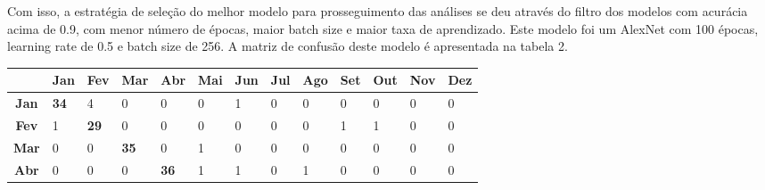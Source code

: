 \documentclass[
	12pt,				%
	openright,			%
	twoside,			%
	a4paper,			%
	english,			%
	brazil,				%
	svgnames
	]{abntex2}\usepackage[]{graphicx}\usepackage[]{color}
\begin{document}
Com isso, a estratégia de seleção do melhor modelo para prosseguimento das análises se deu através do filtro dos modelos com acurácia acima de 0.9, com menor número de épocas, maior batch size e maior taxa de aprendizado. Este modelo foi um AlexNet com 100 épocas, learning rate de 0.5 e batch size de 256. A matriz de confusão deste modelo é apresentada na tabela 2.

\begin{table}[h]
\centering
\begin{tabular}{c|llllllllllll}
\textbf{}    & \multicolumn{1}{c}{\textbf{Jan}} & \multicolumn{1}{c}{\textbf{Fev}} & \multicolumn{1}{c}{\textbf{Mar}} & \multicolumn{1}{c}{\textbf{Abr}} & \multicolumn{1}{c}{\textbf{Mai}} & \multicolumn{1}{c}{\textbf{Jun}} & \multicolumn{1}{c}{\textbf{Jul}} & \multicolumn{1}{c}{\textbf{Ago}} & \multicolumn{1}{c}{\textbf{Set}} & \multicolumn{1}{c}{\textbf{Out}} & \multicolumn{1}{c}{\textbf{Nov}} & \multicolumn{1}{c}{\textbf{Dez}} \\ \hline
\textbf{Jan} & \multicolumn{1}{l|}{\textbf{34}} & 4                                & 0                                & 0                                & 0                                & 1                                & 0                                & 0                                & 0                                & 0                                & 0                                & 0                                \\ \cline{2-3}
\textbf{Fev} & \multicolumn{1}{l|}{1}           & \multicolumn{1}{l|}{\textbf{29}} & 0                                & 0                                & 0                                & 0                                & 0                                & 0                                & 1                                & 1                                & 0                                & 0                                \\ \cline{3-4}
\textbf{Mar} & 0                                & \multicolumn{1}{l|}{0}           & \multicolumn{1}{l|}{\textbf{35}} & 0                                & 1                                & 0                                & 0                                & 0                                & 0                                & 0                                & 0                                & 0                                \\ \cline{4-5}
\textbf{Abr} & 0                                & 0                                & \multicolumn{1}{l|}{0}           & \multicolumn{1}{l|}{\textbf{36}} & 1                                & 1                                & 0                                & 1                                & 0                                & 0                                & 0                                & 0                                \\ \cline{5-6}

\end{tabular}
\end{table}
\end{document}

